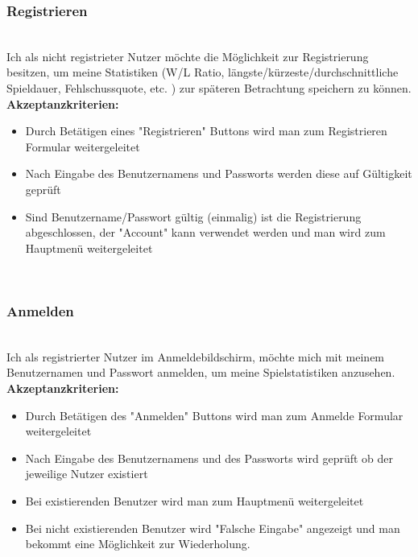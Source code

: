\documentclass[conference]{IEEEtran}
\begin{document}
    \subsubsection{Registrieren}
    \ \\
    Ich als nicht registrieter Nutzer möchte die Möglichkeit zur Registrierung besitzen, um meine Statistiken (W/L Ratio, längste/kürzeste/durchschnittliche Spieldauer, Fehlschussquote, etc. ) zur späteren Betrachtung speichern zu können. \\
    \textbf{Akzeptanzkriterien:}
    \begin{itemize}
        \item Durch Betätigen eines "Registrieren" Buttons wird man zum Registrieren Formular weitergeleitet
        \item Nach Eingabe des Benutzernamens und Passworts werden diese auf Gültigkeit geprüft
        \item Sind Benutzername/Passwort gültig (einmalig) ist die Registrierung abgeschlossen, der "Account" kann verwendet werden und man wird zum Hauptmenü weitergeleitet
    \end{itemize}
    \ \\
    \subsubsection{Anmelden}
    \ \\
    Ich als registrierter Nutzer im Anmeldebildschirm, möchte mich mit meinem Benutzernamen und Passwort anmelden, um meine Spielstatistiken anzusehen. \\
    \textbf{Akzeptanzkriterien:}
    \begin{itemize}
        \item Durch Betätigen des "Anmelden" Buttons wird man zum Anmelde Formular weitergeleitet
        \item Nach Eingabe des Benutzernamens und des Passworts wird geprüft ob der jeweilige Nutzer existiert
        \item Bei existierenden Benutzer wird man zum Hauptmenü weitergeleitet
        \item Bei nicht existierenden Benutzer wird "Falsche Eingabe" angezeigt und man bekommt eine Möglichkeit zur Wiederholung.
    \end{itemize}
    \ \\
\end{document}
